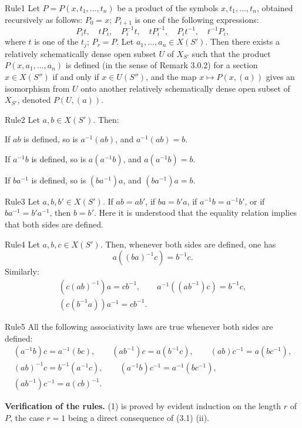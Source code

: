 \begin{enoncerm}{Rule}{1}\label{XVIII.rule.1}
Let \(P=P(x,t_1,\ldots,t_n)\)
be a \og product\fg{} of the
symbols \(x,t_1,\ldots,t_n\),
obtained recursively as follows:
\(P_0=x\); \(P_{i+1}\) is one
of the following expressions:
\[
P_it,\quad tP_i,\quad P_i^{-1}t,\quad
tP_i^{-1},\quad P_it^{-1},\quad t^{-1}P_i,
\]
where \(t\) is one of the \(t_j\);
\(P_r=P\).
Let \(a_1,\ldots,a_n\in X(S')\).
Then there exists a relatively
schematically dense open subset
\(U\) of \(X_{S'}\) such that
the product \(P(x,a_1,\ldots,a_n)\)
is defined (in the sense of
Remark 3.0.2) for a section
\(x\in X(S'')\) if and only
if \(x\in U(S'')\), and the
map \(x\mapsto P(x,(a))\)
gives an isomorphism from
\(U\) onto another relatively
schematically dense open subset
of \(X_{S'}\), denoted \(P(U,(a))\).
\end{enoncerm}
\begin{enoncerm}{Rule}{2}\label{XVIII.rule.2}
Let \(a,b\in X(S')\). Then:

If \(ab\) is defined, so is
\(a^{-1}(ab)\), and \(a^{-1}(ab)=b\).

If \(a^{-1}b\) is defined,
so is \(a(a^{-1}b)\), and \(a(a^{-1}b)=b\).

If \(ba^{-1}\) is defined,
so is \((ba^{-1})a\), and \((ba^{-1})a=b\).
\end{enoncerm}
\begin{enoncerm}{Rule}{3}\label{XVIII.rule.3}
Let \(a,b,b'\in X(S')\).
If \(ab=ab'\), if \(ba=b'a\),
if \(a^{-1}b=a^{-1}b'\), or
if \(ba^{-1}=b'a^{-1}\), then \(b=b'\).
Here it is understood that
the equality relation implies
that both sides are defined.
\end{enoncerm}
\begin{enoncerm}{Rule}{4}\label{XVIII.rule.4}
Let \(a,b,c\in X(S')\).
Then, whenever both sides are
defined, one has
\[
a((ba)^{-1}c)=b^{-1}c.
\]
Similarly:
\[
\begin{gathered}
(c(ab)^{-1})a=cb^{-1},\qquad
a^{-1}((ab^{-1})c)=b^{-1}c,\\
(c(b^{-1}a))a^{-1}=cb^{-1}.
\end{gathered}
\]
\end{enoncerm}
\begin{enoncerm}{Rule}{5}\label{XVIII.rule.5}
All the following associativity
laws are true whenever both
sides are defined:
\[
\begin{gathered}
(a^{-1}b)c=a^{-1}(bc),\qquad
(ab^{-1})c=a(b^{-1}c),\qquad
(ab)c^{-1}=a(bc^{-1}),\\
(ab)^{-1}c=b^{-1}(a^{-1}c),\qquad
(a^{-1}b)c^{-1}=a^{-1}(bc^{-1}),\\
(ab^{-1})c^{-1}=a(cb)^{-1}.
\end{gathered}
\]
\end{enoncerm}
\label{XVIII.3.2.2}
\textbf{Verification of the rules.}
(1) is proved by evident induction
on the length \(r\) of \(P\),
the case \(r=1\) being a direct
consequence of (3.1) (ii).

